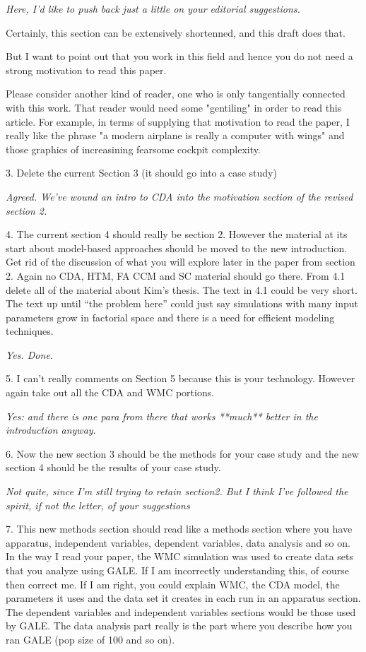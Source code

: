\documentclass[journal]{IEEEtran}
\begin{document}
{\em Here, I'd like to push back just a little on your
editorial suggestions. 

Certainly, this section can
be extensively shortenned, and this draft does that. 

But I want
to point out that you work in this field and hence
you do not need a strong motivation to read this
paper.  

Please consider another kind of reader, one
who is only tangentially connected with this
work. That reader would need some "gentiling" in
order to read this article. For example, in terms of
supplying that motivation to read the paper, I
really like the phrase "a modern airplane is really
a computer with wings" and those graphics of
increasining fearsome cockpit complexity.

}

3.      Delete the current Section 3 (it should go into a case study)

{\em Agreed. We've wound an intro to CDA into the motivation section of 
the revised section 2.

}

4.  The current section 4 should really be section
2. However the material at its start about
model-based approaches should be moved to the new
introduction. Get rid of the discussion of what you
will explore later in the paper from section
2. Again no CDA, HTM, FA CCM and SC material should
go there. From 4.1 delete all of the material about
Kim’s thesis. The text in 4.1 could be very
short. The text up until “the problem here” could
just say simulations with many input parameters grow
in factorial space and there is a need for efficient
modeling techniques.

{\em Yes. Done.}

5.      I can’t really comments on Section 5 because this is your technology. However again take out all the CDA and WMC portions.

{\em Yes: and there is one para from there that works **much** better in the introduction anyway}.

6.      Now the new section 3 should be the methods for your case study and the new section 4 should be the results of your case study.

{\em Not quite, since I'm still trying to retain section2. But I think I've followed the spirit, if not the letter, of your suggestions}

7.      This new methods section should read like a methods section where you have apparatus, independent variables, dependent variables, data analysis and so on. In the way I read your paper, the WMC simulation was used to create data sets that you analyze using GALE. If I am incorrectly understanding this, of course then correct me. If I am right, you could explain WMC, the CDA model, the parameters it uses and the data set it creates in each run in an apparatus section. The dependent variables and independent variables sections would be those used by GALE. The data analysis part really  is the part where you describe how you ran GALE (pop size of 100 and so on).
\end{document}

